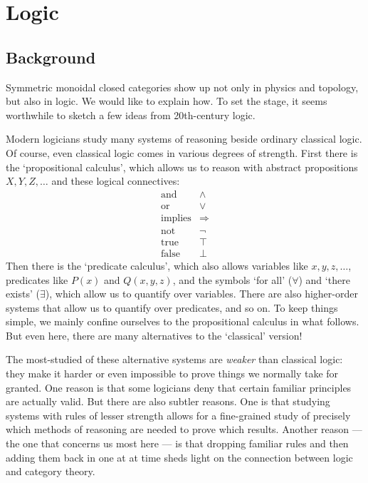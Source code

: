 \documentclass[12pt]{article}
\begin{document}
\section{Logic}
\label{logic}
\EnableBpAbbreviations 

\subsection{Background}
\label{logic_overview}

Symmetric monoidal closed categories show up not only in physics and
topology, but also in logic.  We would like to explain how.
To set the stage, it seems worthwhile to sketch a few ideas from
20th-century logic.  

Modern logicians study many systems of reasoning beside ordinary
classical logic.  Of course, even classical logic comes in 
various degrees of strength.  First there is the `propositional 
calculus', which allows us to reason with abstract propositions 
$X, Y, Z, \dots$ and these logical connectives:
\[  
\begin{array}{cc}
\text{and}        & \wedge   \\
\text{or}         & \vee  \\
\text{implies}    & \Rightarrow \\
\text{not}        & \neg  \\
\text{true}       & \top     \\
\text{false}      & \bot
\end{array}
\]
Then there is the `predicate calculus', which also 
allows variables like $x,y,z, \dots$, predicates like 
$P(x)$ and $Q(x,y,z)$, and the symbols `for all' ($\forall$) 
and `there exists' ($\exists$), which allow us to quantify over variables.
There are also higher-order systems that allow us to quantify over
predicates, and so on.  To keep things simple, we mainly confine ourselves 
to the propositional calculus in what follows.  But even here, there are
many alternatives to the `classical' version!

The most-studied of these alternative systems are {\it weaker} 
than classical logic: they make it harder or even impossible to prove 
things we normally take for granted.  One reason is that some logicians
deny that certain familiar principles are actually valid.  But
there are also subtler reasons.   One is that
studying systems with rules of lesser strength allows for a fine-grained 
study of precisely which methods of reasoning are needed to prove which 
results.  Another reason --- the one that concerns us most here --- 
is that dropping familiar rules and then adding them back in one at 
at time sheds light on the connection between logic and category theory.
\end{document}
